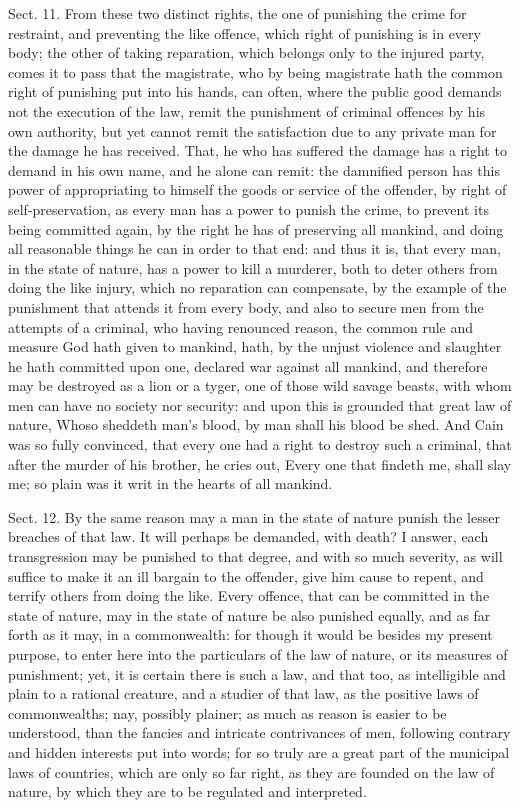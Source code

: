 \documentclass[11pt,openany]{book}
\begin{document}
Sect. 11. From these two distinct rights, the one of punishing the crime for restraint, and preventing the like offence, which right of punishing is in every body; the other of taking reparation, which belongs only to the injured party, comes it to pass that the magistrate, who by being magistrate hath the common right of punishing put into his hands, can often, where the public good demands not the execution of the law, remit the punishment of criminal offences by his own authority, but yet cannot remit the satisfaction due to any private man for the damage he has received. That, he who has suffered the damage has a right to demand in his own name, and he alone can remit: the damnified person has this power of appropriating to himself the goods or service of the offender, by right of self-preservation, as every man has a power to punish the crime, to prevent its being committed again, by the right he has of preserving all mankind, and doing all reasonable things he can in order to that end: and thus it is, that every man, in the state of nature, has a power to kill a murderer, both to deter others from doing the like injury, which no reparation can compensate, by the example of the punishment that attends it from every body, and also to secure men from the attempts of a criminal, who having renounced reason, the common rule and measure God hath given to mankind, hath, by the unjust violence and slaughter he hath committed upon one, declared war against all mankind, and therefore may be destroyed as a lion or a tyger, one of those wild savage beasts, with whom men can have no society nor security: and upon this is grounded that great law of nature, Whoso sheddeth man's blood, by man shall his blood be shed. And Cain was so fully convinced, that every one had a right to destroy such a criminal, that after the murder of his brother, he cries out, Every one that findeth me, shall slay me; so plain was it writ in the hearts of all mankind.

Sect. 12. By the same reason may a man in the state of nature punish the lesser breaches of that law. It will perhaps be demanded, with death? I answer, each transgression may be punished to that degree, and with so much severity, as will suffice to make it an ill bargain to the offender, give him cause to repent, and terrify others from doing the like. Every offence, that can be committed in the state of nature, may in the state of nature be also punished equally, and as far forth as it may, in a commonwealth: for though it would be besides my present purpose, to enter here into the particulars of the law of nature, or its measures of punishment; yet, it is certain there is such a law, and that too, as intelligible and plain to a rational creature, and a studier of that law, as the positive laws of commonwealths; nay, possibly plainer; as much as reason is easier to be understood, than the fancies and intricate contrivances of men, following contrary and hidden interests put into words; for so truly are a great part of the municipal laws of countries, which are only so far right, as they are founded on the law of nature, by which they are to be regulated and interpreted.
\end{document}
